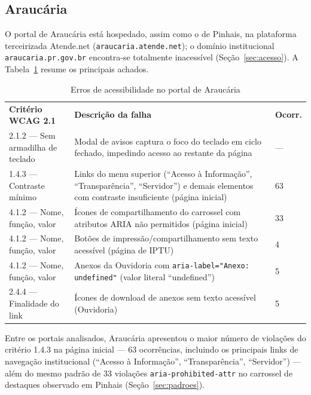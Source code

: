 \documentclass[brazil]{ifpr-pinhais}
\begin{document}
\subsection{Araucária}
\label{subsec:araucaria}

O portal de Araucária está hospedado, assim como o de Pinhais, na plataforma terceirizada Atende.net (\texttt{araucaria.atende.net}); o domínio institucional \texttt{araucaria.pr.gov.br} encontra-se totalmente inacessível (Seção~\ref{sec:acesso}). A Tabela~\ref{tab:araucaria} resume os principais achados.

\begin{table}[htb]
\caption{Erros de acessibilidade no portal de Araucária}
\label{tab:araucaria}
\begin{tabular}{p{3.8cm} p{7cm} p{1.5cm}}
\rowcolor{headerblue}
\color{white}\textbf{Critério WCAG 2.1} & \color{white}\textbf{Descrição da falha} & \color{white}\textbf{Ocorr.} \\
2.1.2 --- Sem armadilha de teclado & Modal de avisos captura o foco do teclado em ciclo fechado, impedindo acesso ao restante da página & --- \\
1.4.3 --- Contraste mínimo    & Links do menu superior (``Acesso à Informação'', ``Transparência'', ``Servidor'') e demais elementos com contraste insuficiente (página inicial) & 63 \\
4.1.2 --- Nome, função, valor & Ícones de compartilhamento do carrossel com atributos ARIA não permitidos (página inicial) & 33 \\
4.1.2 --- Nome, função, valor & Botões de impressão/compartilhamento sem texto acessível (página de IPTU) & 4 \\
4.1.2 --- Nome, função, valor & Anexos da Ouvidoria com \texttt{aria-label="Anexo: undefined"} (valor literal ``undefined'') & 5 \\
2.4.4 --- Finalidade do link  & Ícones de download de anexos sem texto acessível (Ouvidoria) & 5 \\
\end{tabular}
\end{table}

Entre os portais analisados, Araucária apresentou o maior número de violações do critério 1.4.3 na página inicial --- 63 ocorrências, incluindo os principais links de navegação institucional (``Acesso à Informação'', ``Transparência'', ``Servidor'') --- além do mesmo padrão de 33 violações \texttt{aria-prohibited-attr} no carrossel de destaques observado em Pinhais (Seção~\ref{sec:padroes}).
\end{document}
